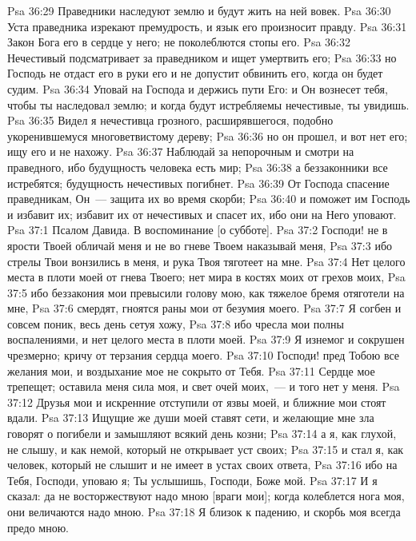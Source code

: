 \vs Psa 36:29 Праведники наследуют землю и будут жить на ней вовек.
\vs Psa 36:30 Уста праведника изрекают премудрость, и язык его произносит правду.
\vs Psa 36:31 Закон Бога его в сердце у него; не поколеблются стопы его.
\vs Psa 36:32 Нечестивый подсматривает за праведником и ищет умертвить его;
\vs Psa 36:33 но Господь не отдаст его в руки его и не допустит обвинить его, когда он будет судим.
\vs Psa 36:34 Уповай на Господа и держись пути Его: и Он вознесет тебя, чтобы ты наследовал землю; и когда будут истребляемы нечестивые, ты увидишь.
\vs Psa 36:35 Видел я нечестивца грозного, расширявшегося, подобно укоренившемуся многоветвистому дереву;
\vs Psa 36:36 но он прошел, и вот нет его; ищу его и не нахожу.
\vs Psa 36:37 Наблюдай за непорочным и смотри на праведного, ибо будущность  человека есть мир;
\vs Psa 36:38 а беззаконники все истребятся; будущность нечестивых погибнет.
\vs Psa 36:39 От Господа спасение праведникам, Он~--- защита их во время скорби;
\vs Psa 36:40 и поможет им Господь и избавит их; избавит их от нечестивых и спасет их, ибо они на Него уповают.
\vs Psa 37:1 Псалом Давида. В воспоминание [о субботе].
\rsbpar\vs Psa 37:2 Господи! не в ярости Твоей обличай меня и не во гневе Твоем наказывай меня,
\vs Psa 37:3 ибо стрелы Твои вонзились в меня, и рука Твоя тяготеет на мне.
\vs Psa 37:4 Нет целого места в плоти моей от гнева Твоего; нет мира в костях моих от грехов моих,
\vs Psa 37:5 ибо беззакония мои превысили голову мою, как тяжелое бремя отяготели на мне,
\vs Psa 37:6 смердят, гноятся раны мои от безумия моего.
\vs Psa 37:7 Я согбен и совсем поник, весь день сетуя хожу,
\vs Psa 37:8 ибо чресла мои полны воспалениями, и нет целого места в плоти моей.
\vs Psa 37:9 Я изнемог и сокрушен чрезмерно; кричу от терзания сердца моего.
\vs Psa 37:10 Господи! пред Тобою все желания мои, и воздыхание мое не сокрыто от Тебя.
\vs Psa 37:11 Сердце мое трепещет; оставила меня сила моя, и свет очей моих,~--- и того нет у меня.
\vs Psa 37:12 Друзья мои и искренние отступили от язвы моей, и ближние мои стоят вдали.
\vs Psa 37:13 Ищущие же души моей ставят сети, и желающие мне зла говорят о погибели  и замышляют всякий день козни;
\vs Psa 37:14 а я, как глухой, не слышу, и как немой, который не открывает уст своих;
\vs Psa 37:15 и стал я, как человек, который не слышит и не имеет в устах своих ответа,
\vs Psa 37:16 ибо на Тебя, Господи, уповаю я; Ты услышишь, Господи, Боже мой.
\vs Psa 37:17 И я сказал: да не восторжествуют надо мною [враги мои]; когда колеблется нога моя, они величаются надо мною.
\vs Psa 37:18 Я близок к падению, и скорбь моя всегда предо мною.
